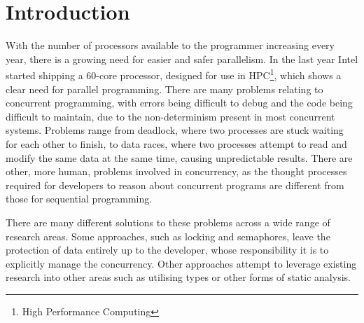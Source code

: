 \documentclass[11pt,a4paper]{report}
\begin{document}
\setcounter{tocdepth}{2}
\tableofcontents

\newpage
\chapter{Introduction}

With the number of processors available to the programmer increasing every year\cite{freelunch}, there is a growing need for easier and safer parallelism.
In the last year Intel started shipping a 60-core processor, designed for use in HPC\footnote{High Performance Computing}\cite{intel-phi}, which shows a clear need for parallel programming.
There are many problems relating to concurrent programming, with errors being difficult to debug and the code being difficult to maintain, due to the non-determinism present in most concurrent systems.
Problems range from deadlock, where two processes are stuck waiting for each other to finish, to data races, where two processes attempt to read and modify the same data at the same time, causing unpredictable results.
There are other, more human, problems involved in concurrency, as the thought processes required for developers to reason about concurrent programs are different from those for sequential programming.

There are many different solutions to these problems across a wide range of research areas.
Some approaches, such as locking and semaphores\cite{dijkstra-semaphore}, leave the protection of data entirely up to the developer, whose responsibility it is to explicitly manage the concurrency.
Other approaches attempt to leverage existing research into other areas such as utilising types or other forms of static analysis.
\end{document}
